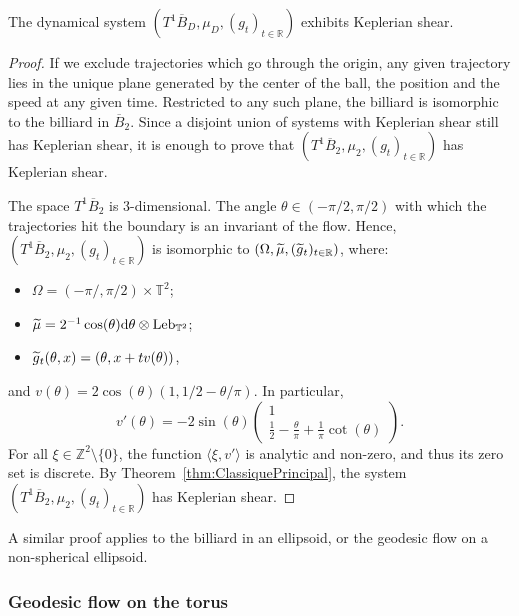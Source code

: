 \documentclass[AHL,Unicode,longabstracts]{cedram}
\DeclareMathOperator{\Leb}{Leb}
\newcommand{\Z}{\mathbb{Z}}
\newcommand{\R}{\mathbb{R}}
\newcommand{\Tbb}{\mathbb{T}}
\newcommand{\de}{{\rm d}}
\let\oldtilde\tilde
\renewcommand*{\tilde}[1]{\mathchoice{\widetilde{#1}}{\widetilde{#1}}{\oldtilde{#1}}{\oldtilde{#1}}}\let\oldhat\hat
\renewcommand*{\hat}[1]{\mathchoice{\widehat{#1}}{\widehat{#1}}{\oldhat{#1}}{\oldhat{#1}}}\let\oldforall\forall
\renewcommand*{\forall}{\mathrel{\oldforall}}
\begin{document}
\begin{prop}
The dynamical system $(T^1 \overline{B}_D, \mu_D, (g_t)_{t \in \R})$ exhibits Keplerian shear.
\end{prop}


\begin{proof}%
If we exclude trajectories which go through the origin, any given trajectory lies in the unique plane generated by the center of the ball, the position and the speed at any given time. Restricted to any such plane, the billiard is isomorphic to the billiard in $\overline{B}_2$. Since a disjoint union of systems with Keplerian shear still has Keplerian shear, it is enough to prove that $(T^1 \overline{B}_2, \mu_2, (g_t)_{t \in \R})$ has Keplerian shear.


The space $T^1 \overline{B}_2$ is $3$-dimensional. The angle $\theta \in (-\pi/2, \pi/2)$ with which the trajectories hit the boundary is an invariant of the flow. Hence, $(T^1 \overline{B}_2, \mu_2, (g_t)_{t \in \R})$ is isomorphic to $(\Omega, \tilde{\mu}, (\tilde{g}_t)_{t \in \R})$, where:
\begin{itemize}
\item $\Omega = (-\pi/, \pi/2) \times \Tbb^2$;
\item $\tilde{\mu} = 2^{-1}\cos(\theta) \de \theta \otimes \Leb_{\Tbb^2}$;
\item $\tilde{g}_t (\theta,x) = (\theta, x+tv(\theta))$,
\end{itemize}
and $v (\theta) = 2 \cos (\theta) (1, 1/2-\theta/\pi)$. In particular,
\[
v' (\theta) = - 2 \sin (\theta)
\begin{pmatrix} 1 \\ \frac{1}{2}-\frac{\theta}{\pi} + \frac{1}{\pi} \cot (\theta)
\end{pmatrix}.
\]
For all $\xi \in \Z^2 \setminus \{0\}$, the function $\langle \xi, v' \rangle$ is analytic and non-zero, and thus its zero set is discrete. By Theorem~\ref{thm:ClassiquePrincipal}, the system $(T^1 \overline{B}_2, \mu_2, (g_t)_{t \in \R})$ has Keplerian shear.
\end{proof}



A similar proof applies to the billiard in an ellipsoid, or the geodesic flow on a non-spherical ellipsoid.



\subsubsection{Geodesic flow on the torus}\label{subsubsec:FlotTM}
\end{document}
